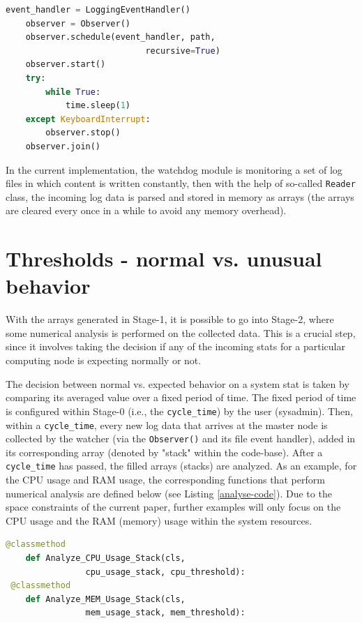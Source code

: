 \documentclass[conference]{IEEEtran}
\begin{document}
\begin{lstlisting}[language=Python, caption=A straightforward example of using the watchdog module to track a file for any changes.,basicstyle=\footnotesize,label={watchdog-code}]
 event_handler = LoggingEventHandler()
    observer = Observer()
    observer.schedule(event_handler, path, 
                            recursive=True)
    observer.start()
    try:
        while True:
            time.sleep(1)
    except KeyboardInterrupt:
        observer.stop()
    observer.join()
\end{lstlisting}

In the current implementation, the watchdog module is monitoring a set of log files in which content is written constantly, then with the help of so-called \texttt{Reader} class, the incoming log data is parsed and stored in memory as arrays (the arrays are cleared every once in a while to avoid any memory overhead).

\section{Thresholds - normal vs. unusual behavior}
\label{section-thresholds}

With the arrays generated in Stage-1, it is possible to go into Stage-2, where some numerical analysis is performed on the collected data. This is a crucial step, since it involves taking the decision if any of the incoming stats for a particular computing node is expecting normally or not.
\par The decision between normal vs. expected behavior on a system stat is taken by comparing its averaged value over a fixed period of time. The fixed period of time is configured within Stage-0 (i.e., the \texttt{cycle\_time}) by the user (sysadmin). Then, within a \texttt{cycle\_time}, every new log data that arrives at the master node is collected by the watcher (via the \texttt{Observer()} and its file event handler), added in its corresponding array (denoted by "stack" within the code-base). After a \texttt{cycle\_time} has passed, the filled arrays (stacks) are analyzed. As an example, for the CPU usage and RAM usage, the corresponding functions that perform numerical analysis are defined below (see Listing \ref{analyse-code}). Due to the space constraints of the current paper, further examples will only focus on the CPU usage and the RAM (memory) usage within the system resources.

\begin{lstlisting}[language=Python, caption=The methods for calculating averaged stats values used within the project code-base.,basicstyle=\footnotesize,label={analyse-code}]
@classmethod
    def Analyze_CPU_Usage_Stack(cls, 
                cpu_usage_stack, cpu_threshold):
 @classmethod
    def Analyze_MEM_Usage_Stack(cls,
                mem_usage_stack, mem_threshold):
\end{lstlisting}
\end{document}
